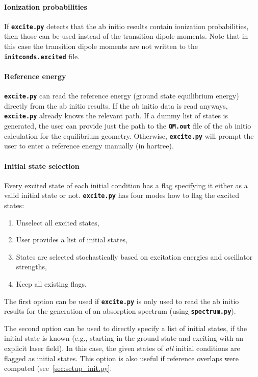 \documentclass[a4paper,10pt,DIV=15,openany,twoside=false]{scrbook}
\newcommand{\ttt}[1]{\textbf{\texttt{#1}}}
\begin{document}
\paragraph{Ionization probabilities}

If \ttt{excite.py} detects that the ab initio results contain ionization probabilities, then those can be used instead of the transition dipole moments. Note that in this case the transition dipole moments are not written to the \ttt{initconds.excited} file. 

\paragraph{Reference energy}

\ttt{excite.py} can read the reference energy (ground state equilibrium energy) directly from the ab initio results. If the ab initio data is read anyways, \ttt{excite.py} already knows the relevant path. If a dummy list of states is generated, the user can provide just the path to the \ttt{QM.out} file of the ab initio calculation for the equilibrium geometry. Otherwise, \ttt{excite.py} will prompt the user to enter a reference energy manually (in hartree).

\paragraph{Initial state selection}

Every excited state of each initial condition has a flag specifying it either as a valid initial state or not. \ttt{excite.py} has four modes how to flag the excited states:
\begin{enumerate}
  \item Unselect all excited states,
  \item User provides a list of initial states,
  \item States are selected stochastically based on excitation energies and oscillator strengths,
  \item Keep all existing flags.
\end{enumerate}
The first option can be used if \ttt{excite.py} is only used to read the ab initio results for the generation of an absorption spectrum (using \ttt{spectrum.py}). 

The second option can be used to directly specify a list of initial states, if the initial state is known (e.g., starting in the ground state and exciting with an explicit laser field). In this case, the given states of \textit{all} initial conditions are flagged as initial states. This option is also useful if reference overlaps were computed (see~\ref{sec:setup_init.py}.
\end{document}
